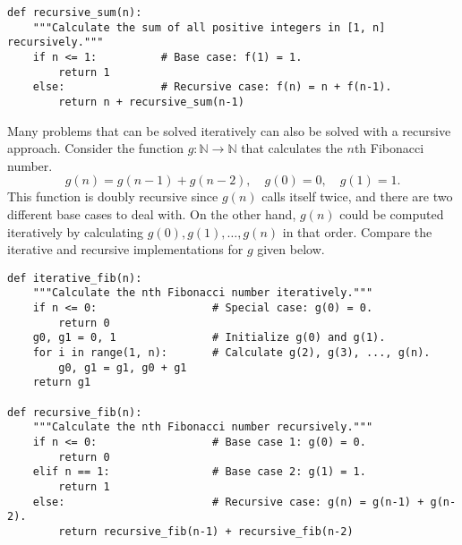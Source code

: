 

\begin{lstlisting}
def recursive_sum(n):
    """Calculate the sum of all positive integers in [1, n] recursively."""
    if n <= 1:          # Base case: f(1) = 1.
        return 1
    else:               # Recursive case: f(n) = n + f(n-1).
        return n + recursive_sum(n-1)
\end{lstlisting}

Many problems that can be solved iteratively can also be solved with a recursive approach.
Consider the function $g:\mathbb{N}\rightarrow\mathbb{N}$ that calculates the $n$th Fibonacci number.
\[
g(n) = g(n-1) + g(n-2),\quad g(0)=0,\quad g(1)=1.
\]
This function is doubly recursive since $g(n)$ calls itself twice, and there are two different base cases to deal with.
On the other hand, $g(n)$ could be computed iteratively by calculating  $g(0),g(1),\ldots,g(n)$ in that order.
Compare the iterative and recursive implementations for $g$ given below.

\begin{lstlisting}
def iterative_fib(n):
    """Calculate the nth Fibonacci number iteratively."""
    if n <= 0:                  # Special case: g(0) = 0.
        return 0
    g0, g1 = 0, 1               # Initialize g(0) and g(1).
    for i in range(1, n):       # Calculate g(2), g(3), ..., g(n).
        g0, g1 = g1, g0 + g1
    return g1

def recursive_fib(n):
    """Calculate the nth Fibonacci number recursively."""
    if n <= 0:                  # Base case 1: g(0) = 0.
        return 0
    elif n == 1:                # Base case 2: g(1) = 1.
        return 1
    else:                       # Recursive case: g(n) = g(n-1) + g(n-2).
        return recursive_fib(n-1) + recursive_fib(n-2)
\end{lstlisting}

